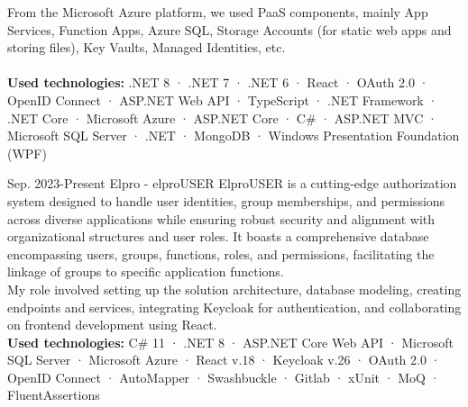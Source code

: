 \documentclass[9pt]{developercv}
\begin{document}
\begin{entrylist}
{From the Microsoft Azure platform, we used PaaS components, mainly App Services, Function Apps, Azure SQL, Storage Accounts (for static web apps and storing files), Key Vaults, Managed Identities, etc. \\ \\
\textbf{Used technologies:} .NET 8 · .NET 7 · .NET 6 · React · OAuth 2.0 · OpenID Connect · ASP.NET Web API · TypeScript · .NET Framework · .NET Core · Microsoft Azure · ASP.NET Core · C\# · ASP.NET MVC · Microsoft SQL Server · .NET · MongoDB · Windows Presentation Foundation (WPF)}

\entry
		{Sep. 2023-Present}
		{Elpro - elproUSER}
		{}
		{ElproUSER is a cutting-edge authorization system designed to handle user identities, group memberships, and permissions across diverse applications while ensuring robust security and alignment with organizational structures and user roles. It boasts a comprehensive database encompassing users, groups, functions, roles, and permissions, facilitating the linkage of groups to specific application functions.  \\
        My role involved setting up the solution architecture, database modeling, creating endpoints and services, integrating Keycloak for authentication, and collaborating on frontend development using React. \\

\textbf{Used technologies:}  C\# 11 · .NET 8 · ASP.NET Core Web API · Microsoft SQL Server · Microsoft Azure · React v.18 · Keycloak v.26 · OAuth 2.0 · OpenID Connect · AutoMapper · Swashbuckle · Gitlab · xUnit · MoQ · FluentAssertions }

\end{entrylist}
\end{document}
